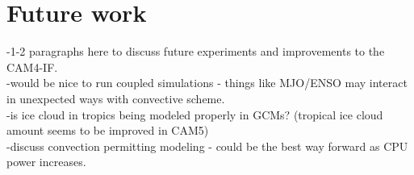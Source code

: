 \documentclass[letterpaper,12pt,titlepage,oneside,final]{book}
\let\origdoublepage\cleardoublepage
\newcommand{\clearemptydoublepage}{%
  \clearpage{\pagestyle{empty}\origdoublepage}}
\let\cleardoublepage\clearemptydoublepage
\begin{document}
\section{Future work}
-1-2 paragraphs here to discuss future experiments and improvements to the CAM4-IF.
\\
-would be nice to run coupled simulations - things like MJO/ENSO may interact in unexpected ways with convective scheme.
\\
-is ice cloud in tropics being modeled properly in GCMs? (tropical ice cloud amount seems to be improved in CAM5)
\\
-discuss convection permitting modeling - could be the best way forward as CPU power increases.
\\




\cleardoublepage %
\renewcommand*{\bibname}{References}

%


\end{document}
